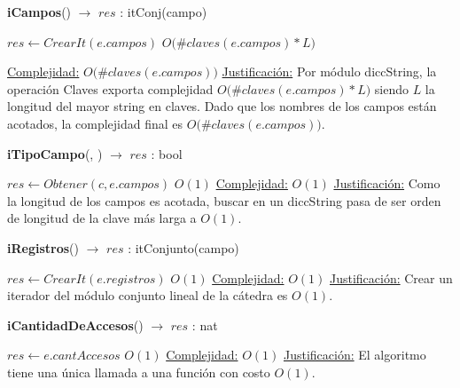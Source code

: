 \begin{Algoritmos}
\begin{algorithm}[H]{\textbf{iCampos}() $\to$ $res$ : itConj(campo)}
      \begin{algorithmic}
        \State $res \gets CrearIt(e.campos)$         \Comment $O\big(\#claves(e.campos) * L\big)$

        \medskip
        \Statex \underline{Complejidad:} {$O\big(\#claves(e.campos)\big)$}
        \Statex \underline{Justificación:} {Por módulo diccString, la operación Claves exporta complejidad $O\big(\#claves(e.campos) * L\big)$ siendo $L$ la longitud del mayor string en claves. Dado que los nombres de los campos están acotados, la complejidad final es $O\big(\#claves(e.campos)\big)$.
}
      \end{algorithmic}
\end{algorithm}

\begin{algorithm}[H]{\textbf{iTipoCampo}(, ) $\to$ $res$ : bool}
      \begin{algorithmic}
      \State $res \gets Obtener(c, e.campos)$         \Comment $O(1)$
      \medskip
      \Statex \underline{Complejidad:} {$O(1)$}
      \Statex \underline{Justificación:} {Como la longitud de los campos es acotada, buscar en un diccString pasa de ser orden de longitud de la clave más larga a $O(1)$.}
      \end{algorithmic}
\end{algorithm}

\begin{algorithm}[H]{\textbf{iRegistros}() $\to$ $res$ : itConjunto(campo)}
      \begin{algorithmic}
      \State $res \gets CrearIt(e.registros)$         \Comment $O(1)$
      \medskip
      \Statex \underline{Complejidad:} {$O(1)$}
      \Statex \underline{Justificación:} {Crear un iterador del módulo conjunto lineal de la cátedra es $O(1)$.}
      \end{algorithmic}
\end{algorithm}

\begin{algorithm}[H]{\textbf{iCantidadDeAccesos}() $\to$ $res$ : nat}
      \begin{algorithmic}
      \State $res \gets e.cantAccesos$         \Comment $O(1)$
      \medskip
      \Statex \underline{Complejidad:} {$O(1)$}
      \Statex \underline{Justificación:} {El algoritmo tiene una única llamada a una función con costo $O(1)$.}
      \end{algorithmic}
\end{algorithm}


\end{Algoritmos}
